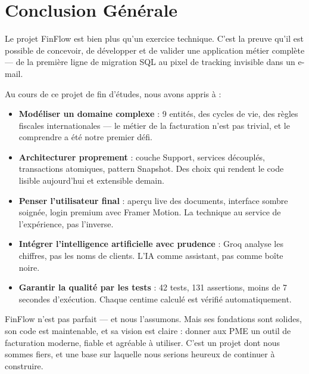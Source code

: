 \documentclass[12pt,a4paper]{report}
\begin{document}
\chapter{Conclusion Générale}
\label{ch:conclusion}

Le projet FinFlow est bien plus qu'un exercice technique. C'est la preuve qu'il est possible de concevoir, de développer et de valider une application métier complète --- de la première ligne de migration SQL au pixel de tracking invisible dans un e-mail.

Au cours de ce projet de fin d'études, nous avons appris à :

\begin{itemize}[leftmargin=*]
    \item \textbf{Modéliser un domaine complexe} : 9 entités, des cycles de vie, des règles fiscales internationales --- le métier de la facturation n'est pas trivial, et le comprendre a été notre premier défi.
    \item \textbf{Architecturer proprement} : couche Support, services découplés, transactions atomiques, pattern Snapshot. Des choix qui rendent le code lisible aujourd'hui et extensible demain.
    \item \textbf{Penser l'utilisateur final} : aperçu live des documents, interface sombre soignée, login premium avec Framer Motion. La technique au service de l'expérience, pas l'inverse.
    \item \textbf{Intégrer l'intelligence artificielle avec prudence} : Groq analyse les chiffres, pas les noms de clients. L'IA comme assistant, pas comme boîte noire.
    \item \textbf{Garantir la qualité par les tests} : 42 tests, 131 assertions, moins de 7 secondes d'exécution. Chaque centime calculé est vérifié automatiquement.
\end{itemize}

FinFlow n'est pas parfait --- et nous l'assumons. Mais ses fondations sont solides, son code est maintenable, et sa vision est claire : donner aux PME un outil de facturation moderne, fiable et agréable à utiliser. C'est un projet dont nous sommes fiers, et une base sur laquelle nous serions heureux de continuer à construire.

\end{document}
